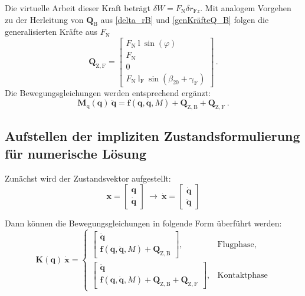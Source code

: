 \documentclass[]{scrartcl}
\begin{document}
Die virtuelle Arbeit dieser Kraft beträgt $\delta W = F_{\mathrm{N}} \delta r_{\mathrm{F}z}$. Mit analogem Vorgehen zu der Herleitung von $\mathbf{Q}_{\mathrm{B}}$ aus \eqref{delta_rB} und \eqref{genKräfteQ_B} folgen die generalisierten Kräfte aus $F_{\mathrm{N}}$
\begin{equation}
	\mathbf{Q}_{\mathrm{Z,F}} = 
	\begin{bmatrix}
		F_{\mathrm{N}} ~ \mathrm{l} ~ \sin(\varphi) \\
		F_{\mathrm{N}} \\
		0 \\
		F_{\mathrm{N}} ~ \mathrm{l_F} ~ \sin(\beta_{20} + \mathrm{\gamma_F})
	\end{bmatrix} \, .
\end{equation}
Die Bewegungsgleichungen werden entsprechend ergänzt:
\begin{equation}
\mathbf{M}_{\mathrm{q}}(\mathbf{q}) \ \ddot{\mathbf{q}} = \mathbf{f}(\mathbf{q}, \dot{\mathbf{q}}, M) + \mathbf{Q}_{\mathrm{Z,B}} + \mathbf{Q}_{\mathrm{Z,F}} \, .
\end{equation}

\subsection{Aufstellen der impliziten Zustandsformulierung für numerische Lösung}
Zunächst wird der Zustandsvektor aufgestellt:
\begin{equation}
	\mathbf{x} =
	\begin{bmatrix}
		\mathbf{q} \\
		\dot{\mathbf{q}}
	\end{bmatrix}
	\ \to \ 
	\dot{\mathbf{x}} =
	\begin{bmatrix}
		\dot{\mathbf{q}} \\
		\ddot{\mathbf{q}}
	\end{bmatrix}
\end{equation}

Dann können die Bewegungsgleichungen in folgende Form überführt werden:
\begin{equation}
	\mathbf{K(q)} ~ \dot{\mathbf{x}} = 
	\begin{cases}
		\begin{bmatrix}
			\dot{\mathbf{q}} \\
			 \mathbf{f}(\mathbf{q}, \dot{\mathbf{q}}, M) + \mathbf{Q}_{\mathrm{Z,B}}
		\end{bmatrix}
		, & \text{Flugphase}, \\
		\begin{bmatrix}
			\dot{\mathbf{q}} \\
			\mathbf{f}(\mathbf{q}, \dot{\mathbf{q}}, M) + \mathbf{Q}_{\mathrm{Z,B}} + \mathbf{Q}_{\mathrm{Z,F}}
		\end{bmatrix}
		, & \text{Kontaktphase}
	\end{cases}
	\label{zustandsform}
\end{equation}
\end{document}
